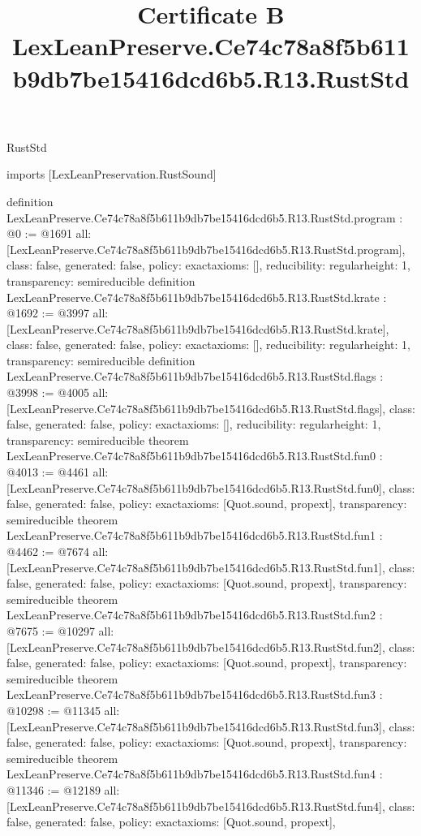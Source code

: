\begin{lexlean}{RustStd}
\title{Certificate B LexLeanPreserve.Ce74c78a8f5b611b9db7be15416dcd6b5.R13.RustStd}
\begin{coremodule}
imports [LexLeanPreservation.RustSound]

definition LexLeanPreserve.Ce74c78a8f5b611b9db7be15416dcd6b5.R13.RustStd.program : @0 := @1691 {
  all: [LexLeanPreserve.Ce74c78a8f5b611b9db7be15416dcd6b5.R13.RustStd.program],
  class: false,
  generated: false,
  policy: exact{axioms: []},
  reducibility: regular{height: 1},
  transparency: semireducible
}
definition LexLeanPreserve.Ce74c78a8f5b611b9db7be15416dcd6b5.R13.RustStd.krate : @1692 := @3997 {
  all: [LexLeanPreserve.Ce74c78a8f5b611b9db7be15416dcd6b5.R13.RustStd.krate],
  class: false,
  generated: false,
  policy: exact{axioms: []},
  reducibility: regular{height: 1},
  transparency: semireducible
}
definition LexLeanPreserve.Ce74c78a8f5b611b9db7be15416dcd6b5.R13.RustStd.flags : @3998 := @4005 {
  all: [LexLeanPreserve.Ce74c78a8f5b611b9db7be15416dcd6b5.R13.RustStd.flags],
  class: false,
  generated: false,
  policy: exact{axioms: []},
  reducibility: regular{height: 1},
  transparency: semireducible
}
theorem LexLeanPreserve.Ce74c78a8f5b611b9db7be15416dcd6b5.R13.RustStd.fun0 : @4013 := @4461 {
  all: [LexLeanPreserve.Ce74c78a8f5b611b9db7be15416dcd6b5.R13.RustStd.fun0],
  class: false,
  generated: false,
  policy: exact{axioms: [Quot.sound, propext]},
  transparency: semireducible
}
theorem LexLeanPreserve.Ce74c78a8f5b611b9db7be15416dcd6b5.R13.RustStd.fun1 : @4462 := @7674 {
  all: [LexLeanPreserve.Ce74c78a8f5b611b9db7be15416dcd6b5.R13.RustStd.fun1],
  class: false,
  generated: false,
  policy: exact{axioms: [Quot.sound, propext]},
  transparency: semireducible
}
theorem LexLeanPreserve.Ce74c78a8f5b611b9db7be15416dcd6b5.R13.RustStd.fun2 : @7675 := @10297 {
  all: [LexLeanPreserve.Ce74c78a8f5b611b9db7be15416dcd6b5.R13.RustStd.fun2],
  class: false,
  generated: false,
  policy: exact{axioms: [Quot.sound, propext]},
  transparency: semireducible
}
theorem LexLeanPreserve.Ce74c78a8f5b611b9db7be15416dcd6b5.R13.RustStd.fun3 : @10298 := @11345 {
  all: [LexLeanPreserve.Ce74c78a8f5b611b9db7be15416dcd6b5.R13.RustStd.fun3],
  class: false,
  generated: false,
  policy: exact{axioms: [Quot.sound, propext]},
  transparency: semireducible
}
theorem LexLeanPreserve.Ce74c78a8f5b611b9db7be15416dcd6b5.R13.RustStd.fun4 : @11346 := @12189 {
  all: [LexLeanPreserve.Ce74c78a8f5b611b9db7be15416dcd6b5.R13.RustStd.fun4],
  class: false,
  generated: false,
  policy: exact{axioms: [Quot.sound, propext]},
}
\end{coremodule}
\end{lexlean}
